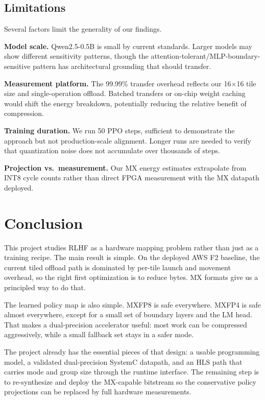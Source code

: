 \documentclass[11pt,a4paper]{article}
\begin{document}
\subsection{Limitations}

Several factors limit the generality of our findings.

\textbf{Model scale.}
Qwen2.5-0.5B is small by current standards.
Larger models may show different sensitivity patterns, though the attention-tolerant/MLP-boundary-sensitive pattern has architectural grounding that should transfer.

\textbf{Measurement platform.}
The 99.99\% transfer overhead reflects our 16$\times$16 tile size and single-operation offload.
Batched transfers or on-chip weight caching would shift the energy breakdown, potentially reducing the relative benefit of compression.

\textbf{Training duration.}
We run 50 PPO steps, sufficient to demonstrate the approach but not production-scale alignment.
Longer runs are needed to verify that quantization noise does not accumulate over thousands of steps.

\textbf{Projection vs.\ measurement.}
Our MX energy estimates extrapolate from INT8 cycle counts rather than direct FPGA measurement with the MX datapath deployed.


\section{Conclusion}

This project studies RLHF as a hardware mapping problem rather than just as a training recipe. The main result is simple. On the deployed AWS F2 baseline, the current tiled offload path is dominated by per-tile launch and movement overhead, so the right first optimization is to reduce bytes. MX formats give us a principled way to do that.

The learned policy map is also simple. MXFP8 is safe everywhere. MXFP4 is safe almost everywhere, except for a small set of boundary layers and the LM head. That makes a dual-precision accelerator useful: most work can be compressed aggressively, while a small fallback set stays in a safer mode.

The project already has the essential pieces of that design: a usable programming model, a validated dual-precision SystemC datapath, and an HLS path that carries mode and group size through the runtime interface. The remaining step is to re-synthesize and deploy the MX-capable bitstream so the conservative policy projections can be replaced by full hardware measurements.
\end{document}

